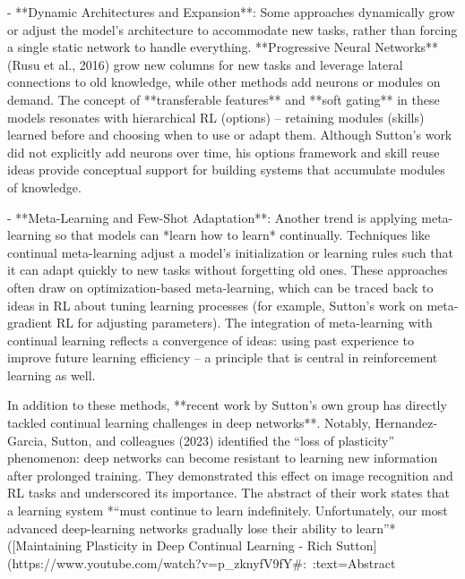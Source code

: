 - **Dynamic Architectures and Expansion**: Some approaches dynamically grow or adjust the model’s architecture to accommodate new tasks, rather than forcing a single static network to handle everything. **Progressive Neural Networks** (Rusu et al., 2016) grow new columns for new tasks and leverage lateral connections to old knowledge, while other methods add neurons or modules on demand. The concept of **transferable features** and **soft gating** in these models resonates with hierarchical RL (options) – retaining modules (skills) learned before and choosing when to use or adapt them. Although Sutton’s work did not explicitly add neurons over time, his options framework and skill reuse ideas provide conceptual support for building systems that accumulate modules of knowledge.

- **Meta-Learning and Few-Shot Adaptation**: Another trend is applying meta-learning so that models can *learn how to learn* continually. Techniques like continual meta-learning adjust a model’s initialization or learning rules such that it can adapt quickly to new tasks without forgetting old ones. These approaches often draw on optimization-based meta-learning, which can be traced back to ideas in RL about tuning learning processes (for example, Sutton’s work on meta-gradient RL for adjusting parameters). The integration of meta-learning with continual learning reflects a convergence of ideas: using past experience to improve future learning efficiency – a principle that is central in reinforcement learning as well.

In addition to these methods, **recent work by Sutton’s own group has directly tackled continual learning challenges in deep networks**. Notably, Hernandez-Garcia, Sutton, and colleagues (2023) identified the “loss of plasticity” phenomenon: deep networks can become resistant to learning new information after prolonged training. They demonstrated this effect on image recognition and RL tasks and underscored its importance. The abstract of their work states that a learning system *“must continue to learn indefinitely. Unfortunately, our most advanced deep-learning networks gradually lose their ability to learn”* ([Maintaining Plasticity in Deep Continual Learning - Rich Sutton](https://www.youtube.com/watch?v=p_zknyfV9fY#:~:text=Abstract%

